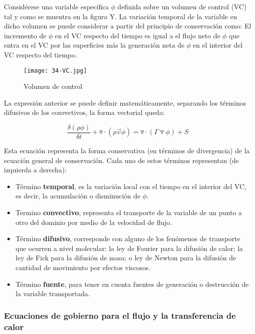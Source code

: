 Considérese una variable específica \(\phi\) definida sobre un volumen
de control (VC) tal y como se muentra en la figura Y. La variación
temporal de la variable en dicho volumen se puede considerar a partir
del principio de conservación como: El incremento de \(\phi\) en el VC
respecto del tiempo es igual a el flujo neto de \(\phi\) que entra en el
VC por las superficies más la generación neta de \(\phi\) en el interior
del VC respecto del tiempo.

\begin{figure}
\centering
\texttt{[image: 34-VC.jpg]}
\caption{Volumen de control}
\label{fig:VC}
\end{figure}

La expresión anterior se puede definir matemáticamente, separando los
términos difusivos de los convectivos, la forma vectorial queda:

\[\frac{\delta\left(\rho\phi\right)}{\delta t}+\triangledown\cdot\left(\rho\overrightarrow{v} \phi \right) = \triangledown \cdot \left( \Gamma \triangledown \phi \right) + S\]

Esta ecuación representa la forma conservativa (en términos de
divergencia) de la ecuación general de conservación. Cada uno de estos
términos representan (de izquierda a derecha):

\begin{itemize}
\item
  Término \textbf{temporal}, es la variación local con el tiempo en el
  interior del VC, es decir, la acumulación o disminución de \(\phi\).
\item
  Termino \textbf{convectivo}, representa el transporte de la variable
  de un punto a otro del dominio por medio de la velocidad de flujo.
\item
  Término \textbf{difusivo}, corresponde con alguno de los fenómenos de
  transporte que ocurren a nivel molecular: la ley de Fourier para la
  difusión de calor; la ley de Fick para la difusión de masa; o ley de
  Newton para la difusión de cantidad de movimiento por efectos
  viscosos.
\item
  Término \textbf{fuente}, para tener en cuenta fuentes de generación o
  destrucción de la variable transportada.
\end{itemize}

\subsubsection{Ecuaciones de gobierno para el flujo y la
transferencia de calor}\label{header-n310}

